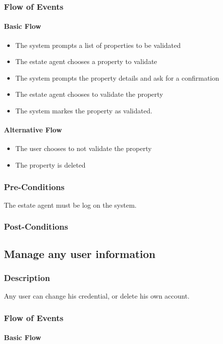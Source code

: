 \documentclass[a4paper,12pt]{article}
\begin{document}
\subsubsection{Flow of Events}
\paragraph{Basic Flow}
\begin{itemize}
\item The system prompts a list of properties to be validated
\item The estate agent chooses a property to validate
\item The system prompts the property details and ask for a confirmation
\item The estate agent chooses to validate the property
\item The system markes the property as validated.
\end{itemize}
\paragraph{Alternative Flow}
\begin{itemize}
\item The user chooses to not validate the property
\item The property is deleted
\end{itemize}
\subsubsection{Pre-Conditions}
The estate agent must be log on the system.
\subsubsection{Post-Conditions}


\subsection{Manage any user information}
\subsubsection{Description}
Any user can change his credential, or delete his own account.
\subsubsection{Flow of Events}
\paragraph{Basic Flow}
\begin{itemize}
\end{itemize}
\end{document}
